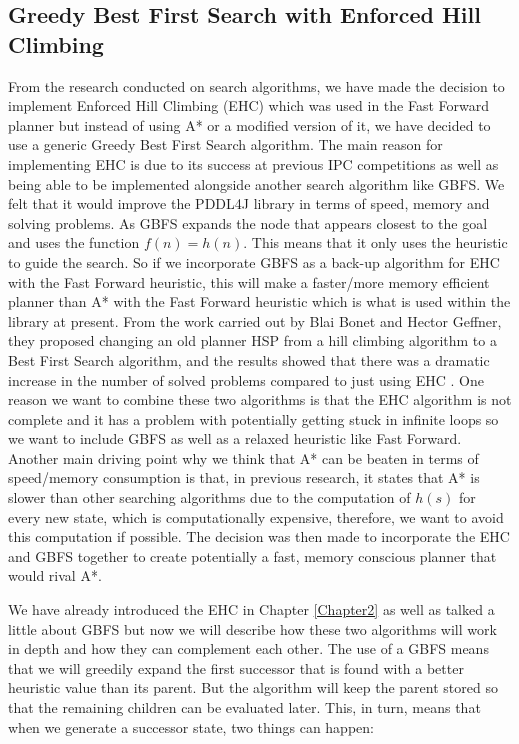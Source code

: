 \subsection{Greedy Best First Search with Enforced Hill Climbing}
From the research conducted on search algorithms, we have made the decision to implement Enforced Hill Climbing (EHC) which was used in the Fast Forward planner \cite{FFPlanner} but instead of using A* or a modified version of it, we have decided to use a generic Greedy Best First Search algorithm\cite{AModernApproach}. The main reason for implementing EHC is due to its success at previous IPC competitions as well as being able to be implemented alongside another search algorithm like GBFS. We felt that it would improve the PDDL4J library in terms of speed, memory and solving problems.
As GBFS expands the node that appears closest to the goal and uses the function $f(n) = h(n)$. This means that it only uses the heuristic to guide the search. So if we incorporate GBFS as a back-up algorithm for EHC with the Fast Forward heuristic, this will make a faster/more memory efficient planner than A* with the Fast Forward heuristic which is what is used within the library at present. 
From the work carried out by Blai Bonet and Hector Geffner, they proposed changing an old planner HSP \cite{HeuristicNewResults} from a hill climbing algorithm to a Best First Search algorithm, and the results showed that there was a dramatic increase in the number of solved problems compared to just using EHC \cite{PlanningHeuristic}. One reason we want to combine these two algorithms is that the EHC algorithm is not complete and it has a problem with potentially getting stuck in infinite loops so we want to include GBFS as well as a relaxed heuristic like Fast Forward. 
Another main driving point why we think that A* can be beaten in terms of speed/memory consumption is that, in previous research, it states that A* is slower than other searching algorithms due to the computation of $h(s)$ for every new state, which is computationally expensive\cite{HeuristicNewResults}, therefore, we want to avoid this computation if possible. The decision was then made to incorporate the EHC and GBFS together to create potentially a fast, memory conscious planner that would rival A*.  

We have already introduced the EHC in Chapter \ref{Chapter2} as well as talked a little about GBFS but now we will describe how these two algorithms will work in depth and how they can complement each other. 
The use of a GBFS means that we will greedily expand the first successor that is found with a better heuristic value than its parent. But the algorithm will keep the parent stored so that the remaining children can be evaluated later. This, in turn, means that when we generate a successor state, two things can happen:
 
